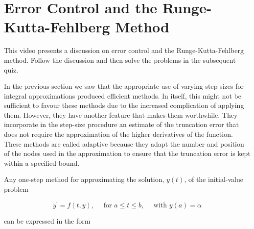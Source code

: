 \section{Error Control and the Runge-Kutta-Fehlberg Method}
\videolesson
\begin{selfvideo}[1]
This video presents a discussion on error control and the Runge-Kutta-Fehlberg method. Follow the discussion and then solve the problems in the subsequent quiz.
\end{selfvideo}

In the previous section we saw that the appropriate use of varying step sizes for integral approximations produced efficient methods. In itself, this might not be sufficient to favour these methods due to the increased complication of applying them. However, they have another feature that makes them worthwhile. They incorporate in the step-size procedure an estimate of the truncation error that does not require the approximation of the higher derivatives of the function. These methods are called adaptive because they adapt the number and position of the nodes used in the approximation to ensure that the truncation error is kept within a specified bound.


Any one-step method for approximating the solution, $y(t)$, of the initial-value problem

$$
y^{\prime}=f(t, y), \quad \text { for } a \leq t \leq b, \quad \text { with } y(a)=\alpha
$$

can be expressed in the form

